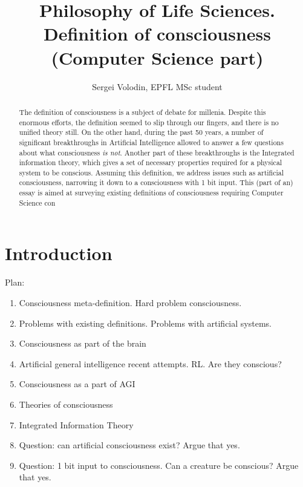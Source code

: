 \documentclass[a4paper]{article}
\title{Philosophy of Life Sciences.\\ Definition of consciousness (Computer Science part)}
\author{Sergei Volodin, EPFL MSc student}
\date{}
\begin{document}
\maketitle

\begin{abstract}
The definition of consciousness is a subject of debate for millenia.
Despite this enormous efforts, the definition seemed to slip through our fingers, and there is no unified theory still.
On the other hand, during the past 50 years, a number of significant breakthroughs in Artificial Intelligence allowed to answer a few questions about what consciousness {\em is not}.
Another part of these breakthroughs is the Integrated information theory, which gives a set of necessary properties required for a physical system to be conscious.
Assuming this definition, we address issues such as artificial consciousness, narrowing it down to a consciousness with 1 bit input.
This (part of an) essay is aimed at surveying existing definitions of consciousness requiring Computer Science con
\end{abstract}

\section{Introduction}
Plan:\begin{enumerate}
\item Consciousness meta-definition. Hard problem consciousness.
\item Problems with existing definitions. Problems with artificial systems.
\item Consciousness as part of the brain
\item Artificial general intelligence recent attempts. RL. Are they conscious?
\item Consciousness as a part of AGI
\item Theories of consciousness
\item Integrated Information Theory
\item Question: can artificial consciousness exist? Argue that yes.
\item Question: 1 bit input to consciousness. Can a creature be conscious? Argue that yes.
\end{enumerate}

\end{document}
